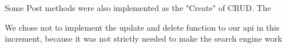 Some Post methods were also implemented as the "Create" of CRUD.
The 




We chose not to implement the update and delete function to our api in this increment, 
because it was not strictly needed to make the search engine work





    






